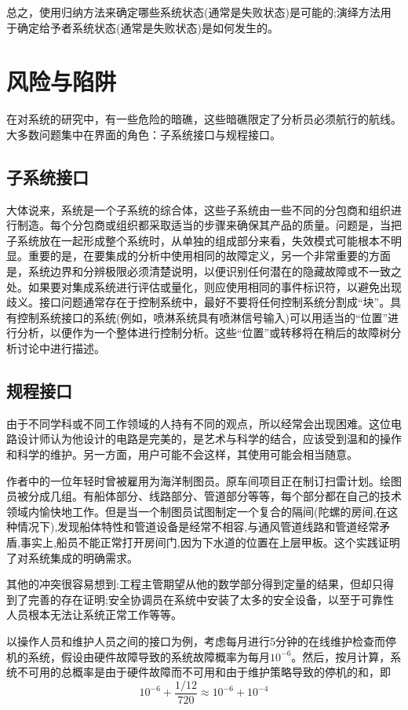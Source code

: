 \documentclass[cn,11pt,chinese]{elegantbook}
\begin{document}
总之，使用归纳方法来确定哪些系统状态(通常是失败状态)是可能的;演绎方法用于确定给予者系统状态(通常是失败状态)是如何发生的。

\section{风险与陷阱}

在对系统的研究中，有一些危险的暗礁，这些暗礁限定了分析员必须航行的航线。大多数问题集中在界面的角色：子系统接口与规程接口。

\subsection{子系统接口}

大体说来，系统是一个子系统的综合体，这些子系统由一些不同的分包商和组织进行制造。每个分包商或组织都采取适当的步骤来确保其产品的质量。问题是，当把子系统放在一起形成整个系统时，从单独的组成部分来看，失效模式可能根本不明显。重要的是，在要集成的分析中使用相同的故障定义，另一个非常重要的方面是，系统边界和分辨极限必须清楚说明，以便识别任何潜在的隐藏故障或不一致之处。如果要对集成系统进行评估或量化，则应使用相同的事件标识符，以避免出现歧义。接口问题通常存在于控制系统中，最好不要将任何控制系统分割成“块”。具有控制系统接口的系统(例如，喷淋系统具有喷淋信号输入)可以用适当的“位置”进行分析，以便作为一个整体进行控制分析。这些“位置”或转移将在稍后的故障树分析讨论中进行描述。

\subsection{规程接口}

由于不同学科或不同工作领域的人持有不同的观点，所以经常会出现困难。这位电路设计师认为他设计的电路是完美的，是艺术与科学的结合，应该受到温和的操作和科学的维护。另一方面，用户可能不会这样，其使用可能会相当随意。

作者中的一位年轻时曾被雇用为海洋制图员。原车间项目正在制订扫雷计划。绘图员被分成几组。有船体部分、线路部分、管道部分等等，每个部分都在自己的技术领域内愉快地工作。但是当一个制图员试图制定一个复合的隔间(陀螺的房间,在这种情况下),发现船体特性和管道设备是经常不相容,与通风管道线路和管道经常矛盾,事实上,船员不能正常打开房间门,因为下水道的位置在上层甲板。这个实践证明了对系统集成的明确需求。

其他的冲突很容易想到:工程主管期望从他的数学部分得到定量的结果，但却只得到了完善的存在证明;安全协调员在系统中安装了太多的安全设备，以至于可靠性人员根本无法让系统正常工作等等。

以操作人员和维护人员之间的接口为例，考虑每月进行5分钟的在线维护检查而停机的系统，假设由硬件故障导致的系统故障概率为每月$10^{-6}$。然后，按月计算，系统不可用的总概率是由于硬件故障而不可用和由于维护策略导致的停机的和，即
$$ 10^{-6}+\frac{1/12}{720} \approx 10^{-6}+10^{-4}$$
\end{document}
